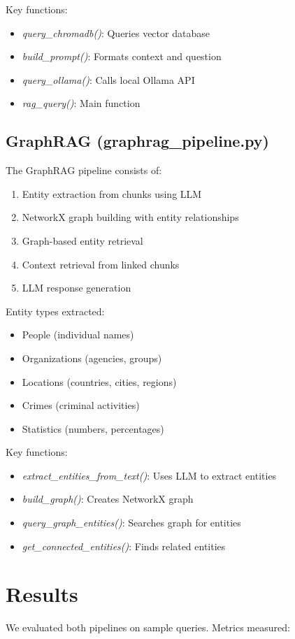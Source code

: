 \documentclass[a4paper,12pt]{article}
\begin{document}
Key functions:
\begin{itemize}
    \item \textit{query\_chromadb()}: Queries vector database
    \item \textit{build\_prompt()}: Formats context and question
    \item \textit{query\_ollama()}: Calls local Ollama API
    \item \textit{rag\_query()}: Main function
\end{itemize}

\subsection{GraphRAG (graphrag\_pipeline.py)}
The GraphRAG pipeline consists of:
\begin{enumerate}
    \item Entity extraction from chunks using LLM
    \item NetworkX graph building with entity relationships
    \item Graph-based entity retrieval
    \item Context retrieval from linked chunks
    \item LLM response generation
\end{enumerate}

Entity types extracted:
\begin{itemize}
    \item People (individual names)
    \item Organizations (agencies, groups)
    \item Locations (countries, cities, regions)
    \item Crimes (criminal activities)
    \item Statistics (numbers, percentages)
\end{itemize}

Key functions:
\begin{itemize}
    \item \textit{extract\_entities\_from\_text()}: Uses LLM to extract entities
    \item \textit{build\_graph()}: Creates NetworkX graph
    \item \textit{query\_graph\_entities()}: Searches graph for entities
    \item \textit{get\_connected\_entities()}: Finds related entities
\end{itemize}

\section{Results}
We evaluated both pipelines on sample queries. Metrics measured:
\end{document}
